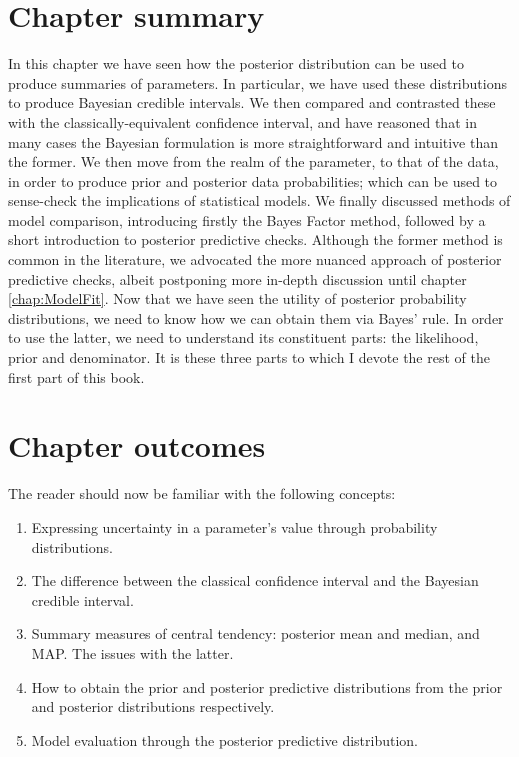 \documentclass[11pt,fullpage]{book}
\begin{document}
\section{Chapter summary}
In this chapter we have seen how the posterior distribution can be used to produce summaries of parameters. In particular, we have used these distributions to produce Bayesian credible intervals. We then compared and contrasted these with the classically-equivalent confidence interval, and have reasoned that in many cases the Bayesian formulation is more straightforward and intuitive than the former. We then move from the realm of the parameter, to that of the data, in order to produce prior and posterior data probabilities; which can be used to sense-check the implications of statistical models. We finally discussed methods of model comparison, introducing firstly the Bayes Factor method, followed by a short introduction to posterior predictive checks. Although the former method is common in the literature, we advocated the more nuanced approach of posterior predictive checks, albeit postponing more in-depth discussion until chapter \ref{chap:ModelFit}. Now that we have seen the utility of posterior probability distributions, we need to know how we can obtain them via Bayes' rule. In order to use the latter, we need to understand its constituent parts: the likelihood, prior and denominator. It is these three parts to which I devote the rest of the first part of this book.

\section{Chapter outcomes}
The reader should now be familiar with the following concepts:
\begin{enumerate}
\item Expressing uncertainty in a parameter's value through probability distributions.
\item The difference between the classical confidence interval and the Bayesian credible interval.
\item Summary measures of central tendency: posterior mean and median, and MAP. The issues with the latter.
\item How to obtain the prior and posterior predictive distributions from the prior and posterior distributions respectively.
\item Model evaluation through the posterior predictive distribution.
\end{enumerate}
\end{document}
